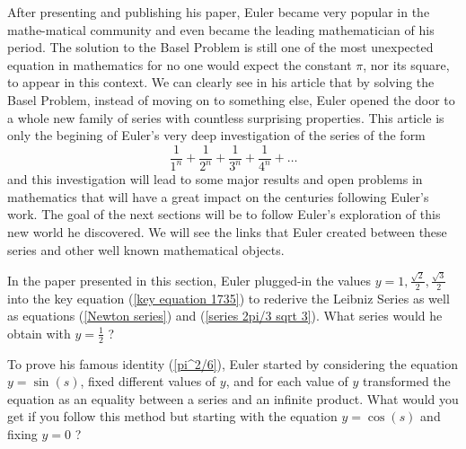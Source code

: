 After presenting and publishing his paper, Euler became very popular in the mathe-matical community and even became the leading mathematician of his period. The solution to the Basel Problem is still one of the most unexpected equation in mathematics for no one would expect the constant $\pi$, nor its square, to appear in this context. We can clearly see in his article that by solving the Basel Problem, instead of moving on to something else, Euler opened the door to a whole new family of series with countless surprising properties. This article is only the begining of Euler's very deep investigation of the series of the form
$$\frac{1}{1^n} + \frac{1}{2^n} + \frac{1}{3^n} + \frac{1}{4^n} + \dots$$
and this investigation will lead to some major results and open problems in mathematics that will have a great impact on the centuries following Euler's work. The goal of the next sections will be to follow Euler's exploration of this new world he discovered. We will see the links that Euler created between these series and other well known mathematical objects. \newpage


\begin{exercise}
    In the paper presented in this section, Euler plugged-in the values $y=1, \frac{\sqrt{2}}{2}, \frac{\sqrt{3}}{2}$ into the key equation (\ref{key equation 1735}) to rederive the Leibniz Series as well as equations (\ref{Newton series}) and (\ref{series 2pi/3 sqrt 3}). What series would he obtain with $y = \frac{1}{2}$ ?
\end{exercise}

\begin{exercise}
    To prove his famous identity (\ref{pi^2/6}), Euler started by considering the equation $y = \sin(s)$, fixed different values of $y$, and for each value of $y$ transformed the equation as an equality between a series and an infinite product. What would you get if you follow this method but starting with the equation $y = \cos(s)$ and fixing $y = 0$ ?
\end{exercise}

